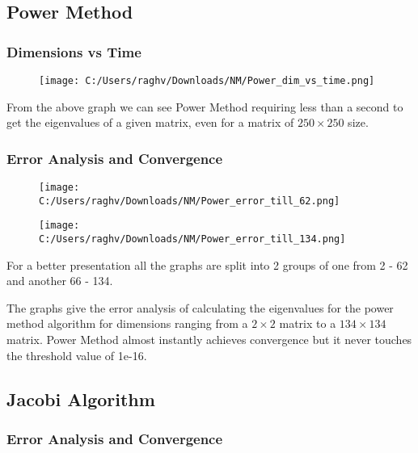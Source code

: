 \documentclass{article}
\begin{document}
\subsection{Power Method}
\subsubsection{Dimensions vs Time}

\begin{figure}[h]
    \centering
    \texttt{[image: C:/Users/raghv/Downloads/NM/Power\_dim\_vs\_time.png]}
    \label{fig:image2}
\end{figure}

From the above graph we can see Power Method requiring less than a second to get the eigenvalues of a given matrix, even for a matrix of $250 \times 250$ size.

\subsubsection{Error Analysis and Convergence}

\begin{figure}[h]
    \centering
    \texttt{[image: C:/Users/raghv/Downloads/NM/Power\_error\_till\_62.png]}
    \label{fig:image2}
\end{figure}

\begin{figure}[h]
    \centering
    \texttt{[image: C:/Users/raghv/Downloads/NM/Power\_error\_till\_134.png]}
    \label{fig:image2}
\end{figure}

For a better presentation all the graphs are split into 2 groups of one from 2 - 62 and another 66 - 134.

The graphs give the error analysis of calculating the eigenvalues for the power method algorithm for dimensions ranging from a $2 \times 2$ matrix to a $134 \times 134$ matrix. Power Method almost instantly achieves convergence but it never touches the threshold value of 1e-16.

\subsection{Jacobi Algorithm}
\subsubsection{Error Analysis and Convergence}
\end{document}
